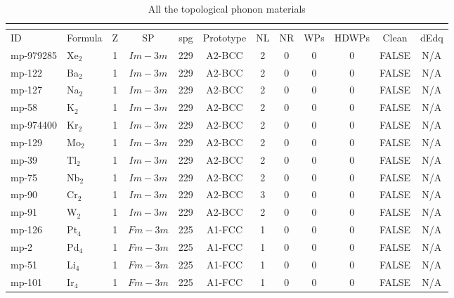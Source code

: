 {
\tiny
\begin{longtable}{llcccccccccc}
\caption{All the topological phonon materials}\\
\label{all}\\
\toprule
 \multicolumn{1}{l}{ID} &       \multicolumn{1}{l}{Formula} & \multicolumn{1}{c}{Z} &  \multicolumn{1}{c}{SP} &   \multicolumn{1}{c}{spg} &    \multicolumn{1}{c}{Prototype} &   \multicolumn{1}{c}{NL} &   \multicolumn{1}{c}{NR} &  \multicolumn{1}{c}{WPs} &  \multicolumn{1}{c}{HDWPs} &  \multicolumn{1}{c}{Clean}  &   \multicolumn{1}{c}{dEdq} \\
\midrule
\endhead
\bottomrule
\endfoot
    mp-979285 & Xe$_{2}$ & 1     & $Im-3m$ & 229   & A2-BCC & 2     & 0     & 0     & 0     & FALSE & N/A \\
    mp-122 & Ba$_{2}$ & 1     & $Im-3m$ & 229   & A2-BCC & 2     & 0     & 0     & 0     & FALSE & N/A \\
    mp-127 & Na$_{2}$ & 1     & $Im-3m$ & 229   & A2-BCC & 2     & 0     & 0     & 0     & FALSE & N/A \\
    mp-58 & K$_{2}$ & 1     & $Im-3m$ & 229   & A2-BCC & 2     & 0     & 0     & 0     & FALSE & N/A \\
    mp-974400 & Kr$_{2}$ & 1     & $Im-3m$ & 229   & A2-BCC & 2     & 0     & 0     & 0     & FALSE & N/A \\
    mp-129 & Mo$_{2}$ & 1     & $Im-3m$ & 229   & A2-BCC & 2     & 0     & 0     & 0     & FALSE & N/A \\
    mp-39 & Tl$_{2}$ & 1     & $Im-3m$ & 229   & A2-BCC & 2     & 0     & 0     & 0     & FALSE & N/A \\
    mp-75 & Nb$_{2}$ & 1     & $Im-3m$ & 229   & A2-BCC & 2     & 0     & 0     & 0     & FALSE & N/A \\
    mp-90 & Cr$_{2}$ & 1     & $Im-3m$ & 229   & A2-BCC & 3     & 0     & 0     & 0     & FALSE & N/A \\
    mp-91 & W$_{2}$ & 1     & $Im-3m$ & 229   & A2-BCC & 2     & 0     & 0     & 0     & FALSE & N/A \\
    mp-126 & Pt$_{4}$ & 1     & $Fm-3m$ & 225   & A1-FCC & 1     & 0     & 0     & 0     & FALSE & N/A \\
    mp-2  & Pd$_{4}$ & 1     & $Fm-3m$ & 225   & A1-FCC & 1     & 0     & 0     & 0     & FALSE & N/A \\
    mp-51 & Li$_{4}$ & 1     & $Fm-3m$ & 225   & A1-FCC & 1     & 0     & 0     & 0     & FALSE & N/A \\
    mp-101 & Ir$_{4}$ & 1     & $Fm-3m$ & 225   & A1-FCC & 1     & 0     & 0     & 0     & FALSE & N/A \\

\end{longtable}}
